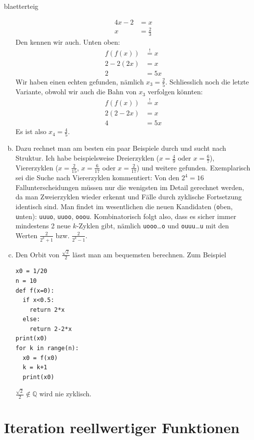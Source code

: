 \documentclass[%
<<<<<<< Updated upstream
11pt,%
twoside,%
titlepage,%
german,%
headsepline%
]{scrartcl}
\begin{document}
\begin{lsg}{blaetterteig}
\begin{enumerate}[a)]
\begin{align*}
4x-2 &= x\\
x &= \frac{2}{3}
\end{align*}
Den kennen wir auch. Unten oben:
\begin{align*}
f(f(x)) &\stackrel{!}{=} x\\
2-2(2x) &= x\\
2 &= 5x
\end{align*}
Wir haben einen echten gefunden, n\"amlich $x_{3}=\frac{2}{5}$. Schliesslich noch die letzte Variante, obwohl wir auch die Bahn von $x_{3}$ verfolgen k\"onnten:
\begin{align*}
f(f(x)) &\stackrel{!}{=} x\\
2(2-2x) &= x\\
4 &= 5x
\end{align*}
Es ist also $x_{4}=\frac{4}{5}$.
\item Dazu rechnet man am besten ein paar Beispiele durch und sucht nach Struktur. Ich habe beispielsweise Dreierzyklen ($x=\frac{4}{9}$ oder $x=\frac{6}{7}$), Viererzyklen ($x=\frac{2}{15}$, $x=\frac{6}{17}$ oder $x=\frac{2}{17}$) und weitere gefunden. Exemplarisch sei die Suche nach Viererzyklen kommentiert: Von den $2^{4}=16$ Fallunterscheidungen m\"ussen nur die wenigsten im Detail gerechnet werden, da man Zweierzyklen wieder erkennt und F\"alle durch zyklische Fortsetzung identisch sind. Man findet im wesentlichen die neuen Kandidaten (\texttt{o}ben, \texttt{u}nten): \texttt{uuuo}, \texttt{uuoo}, \texttt{ooou}. Kombinatorisch folgt also, dass es sicher immer mindestens 2 neue $k$-Zyklen gibt, n\"amlich \texttt{uooo}\dots\texttt{o} und \texttt{ouuu}\dots\texttt{u} mit den Werten $\frac{2}{2^{k}+1}$ bzw. $\frac{2}{2^{k}-1}$.
\item Den Orbit von $\frac{\sqrt{2}}{2}$ l\"asst man am bequemsten berechnen. Zum Beispiel
\begin{lstlisting}
x0 = 1/20
n = 10
def f(x=0):
  if x<0.5:
    return 2*x
  else:
    return 2-2*x
print(x0)
for k in range(n):
  x0 = f(x0)
  k = k+1
  print(x0)
\end{lstlisting}
$\frac{\sqrt{2}}{2}\not\in\mathbb{Q}$ wird nie zyklisch.
\end{enumerate}
\end{lsg}

\clearpage

\section{Iteration reellwertiger Funktionen}
\end{document}
